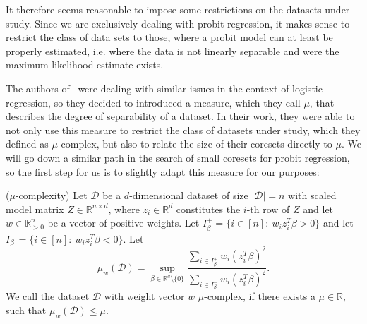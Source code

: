 It therefore seems reasonable to impose some restrictions on the
datasets under study. Since we are exclusively dealing with
probit regression, it makes sense to restrict the
class of data sets to those, where a probit model can
at least be properly estimated, i.e. where the data is not linearly separable
and were the maximum likelihood estimate exists.

The authors of~\cite{on-coresets} were dealing with similar issues in
the context of logistic regression, so they decided to introduced a
measure, which they call $\mu$, that describes the degree of separability
of a dataset.
In their work, they were able to not only use this measure to restrict
the class of datasets under study, which they defined as $\mu$-complex,
but also to relate the size of their coresets directly to $\mu$.
We will go down a similar path in the search of small coresets for probit
regression, so the first step for us is to slightly adapt this measure
for our purposes:

\begin{definition}($\mu$-complexity)
    \label{def:mu}
    Let $\mathcal{D}$ be a $d$-dimensional dataset of size
    $|\mathcal{D}|=n$ with scaled
    model matrix $Z \in \mathbb{R}^{n \times d}$, where
    $z_i \in \mathbb{R}^d$ constitutes the $i$-th
    row of $Z$ and let
    $w \in \mathbb{R}^n_{>0}$ be a vector of positive weights.
    Let $I_\beta^+ = \{i \in [n]:\ w_i z_i^T \beta > 0 \}$
    and let $I_\beta^- = \{i \in [n]:\ w_i z_i^T \beta < 0 \}$.
    Let
    \begin{equation*}
        \mu_w(\mathcal{D}) = \sup_{\beta \in \mathbb{R}^d \setminus \{0\}}
        \frac{\sum_{i \in I_\beta^+} w_i (z_i^T \beta)^2}
        {\sum_{i \in I_\beta^-} w_i (z_i^T \beta)^2}.
    \end{equation*}
    We call the dataset $\mathcal{D}$ with weight vector $w$
    $\mu$-complex, if there exists a $\mu \in \mathbb{R}$,
    such that $\mu_w(\mathcal{D}) \leq \mu$.
\end{definition}

